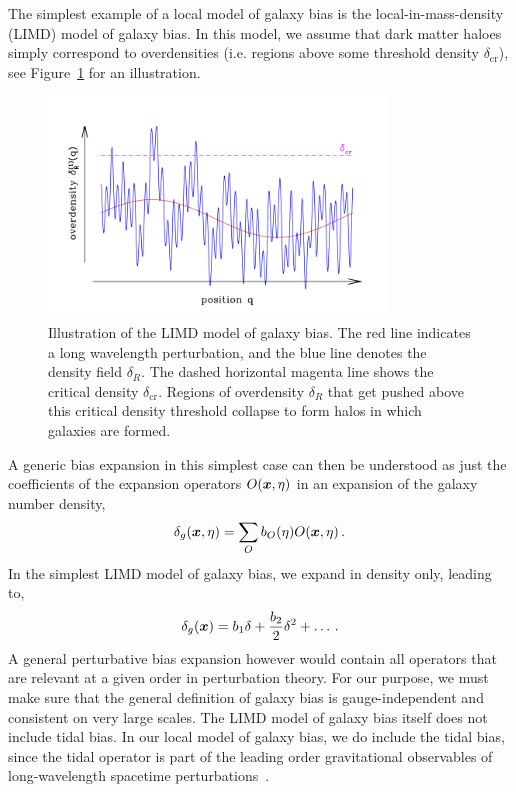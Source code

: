 The simplest example of a local model of galaxy bias is the local-in-mass-density (LIMD) model of galaxy bias. In this model, we assume that dark matter haloes simply correspond to overdensities (i.e. regions above some threshold density $\delta_\mathrm{cr}$), see Figure~\ref{fig:limdcartoon} for an illustration. 

\begin{figure}[!ht]
	\centering
	\includegraphics[width=0.8\textwidth]{fig/limdcartoon.png}
	\caption{Illustration of the LIMD model of galaxy bias. The red line indicates a long wavelength perturbation, and the blue line denotes the density field $\delta_R$. The dashed horizontal magenta line shows the critical density $\delta_{\mathrm{cr}}$. Regions of overdensity $\delta_R$ that get pushed above this critical density threshold collapse to form halos in which galaxies are formed.}
	\label{fig:limdcartoon}
\end{figure}
A generic bias expansion in this simplest case can then be understood as just the coefficients of the expansion operators $O(\bm {x},\eta)$ in an expansion of the galaxy number density, 
\begin{equation}
	\delta_g(\bm {x},\eta) = \sum_O b_O(\eta) O(\bm {x},\eta)\,.
\end{equation}
In the simplest LIMD model of galaxy bias, we expand in density only, leading to, 
\begin{equation}
	\delta_g(\bm {x}) = b_1 \delta + \frac{b_2}{2} \delta^2 + \ldots\,.
\end{equation}
A general perturbative bias expansion however would contain all operators that are relevant at a given order in perturbation theory. For our purpose, we must make sure that the general definition of galaxy bias is gauge-independent and consistent on very large scales. The LIMD model of galaxy bias itself does not include tidal bias. In our local model of galaxy bias, we do include the tidal bias, since the tidal operator is part of the leading order gravitational observables of long-wavelength spacetime perturbations~\cite{Desjacques:2016bnm}. 

